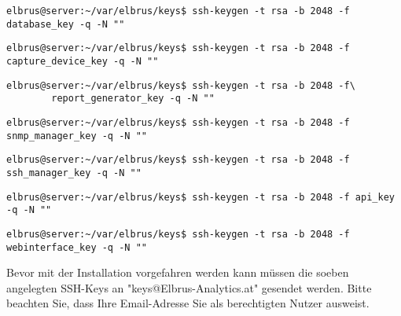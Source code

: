 \documentclass{article}
\begin{document}
	\begin{lstlisting}[caption={Erstellen des SSH-keys der für das Herunterladen der 'Database' benötigt wird.}]
		elbrus@server:~/var/elbrus/keys$ ssh-keygen -t rsa -b 2048 -f database_key -q -N ""
	\end{lstlisting}

	\begin{lstlisting}[caption={Erstellen des SSH-keys der für das Herunterladen des 'Capture-Device' benötigt wird.}]
		elbrus@server:~/var/elbrus/keys$ ssh-keygen -t rsa -b 2048 -f capture_device_key -q -N ""
	\end{lstlisting}

	\begin{lstlisting}[caption={Erstellen des SSH-keys der für das Herunterladen des 'Report-Generator' benötigt wird.}]
		elbrus@server:~/var/elbrus/keys$ ssh-keygen -t rsa -b 2048 -f\
		report_generator_key -q -N ""
	\end{lstlisting}

	\begin{lstlisting}[caption={Erstellen des SSH-keys der für das Herunterladen des 'SNMP-Managers' benötigt wird.}]
		elbrus@server:~/var/elbrus/keys$ ssh-keygen -t rsa -b 2048 -f snmp_manager_key -q -N ""
	\end{lstlisting}

	\begin{lstlisting}[caption={Erstellen des SSH-keys der für das Herunterladen des 'SSH-Managers' benötigt wird.}]
		elbrus@server:~/var/elbrus/keys$ ssh-keygen -t rsa -b 2048 -f ssh_manager_key -q -N ""
	\end{lstlisting}
	
	\begin{lstlisting}[caption={Erstellen des SSH-keys der für das Herunterladen der 'API' benötigt wird.}]
		elbrus@server:~/var/elbrus/keys$ ssh-keygen -t rsa -b 2048 -f api_key -q -N ""
	\end{lstlisting}
	
	\begin{lstlisting}[caption={Erstellen des SSH-keys der für das Herunterladen des 'Webinterfaces' benötigt wird.}]
		elbrus@server:~/var/elbrus/keys$ ssh-keygen -t rsa -b 2048 -f webinterface_key -q -N ""
	\end{lstlisting}
	Bevor mit der Installation vorgefahren werden kann müssen die soeben angelegten SSH-Keys an "keys@Elbrus-Analytics.at" gesendet werden. Bitte beachten Sie, dass Ihre Email-Adresse Sie als berechtigten Nutzer ausweist.
	
\end{document}
